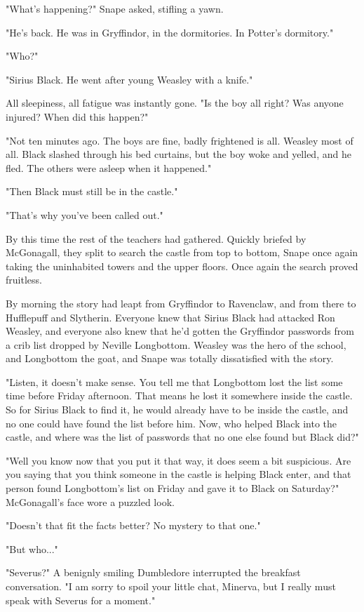 \documentclass[a4paper,11pt]{article}
\begin{document}
"What's happening?" Snape asked, stifling a yawn.

"He's back. He was in Gryffindor, in the dormitories. In Potter's dormitory."

"Who?"

"Sirius Black. He went after young Weasley with a knife."

All sleepiness, all fatigue was instantly gone. "Is the boy all right? Was anyone injured? When did this happen?"

"Not ten minutes ago. The boys are fine, badly frightened is all. Weasley most of all. Black slashed through his bed curtains, but the boy woke and yelled, and he fled. The others were asleep when it happened."

"Then Black must still be in the castle."

"That's why you've been called out."

By this time the rest of the teachers had gathered. Quickly briefed by McGonagall, they split to search the castle from top to bottom, Snape once again taking the uninhabited towers and the upper floors. Once again the search proved fruitless.

By morning the story had leapt from Gryffindor to Ravenclaw, and from there to Hufflepuff and Slytherin. Everyone knew that Sirius Black had attacked Ron Weasley, and everyone also knew that he'd gotten the Gryffindor passwords from a crib list dropped by Neville Longbottom. Weasley was the hero of the school, and Longbottom the goat, and Snape was totally dissatisfied with the story.

"Listen, it doesn't make sense. You tell me that Longbottom lost the list some time before Friday afternoon. That means he lost it somewhere inside the castle. So for Sirius Black to find it, he would already have to be inside the castle, and no one could have found the list before him. Now, who helped Black into the castle, and where was the list of passwords that no one else found but Black did?"

"Well you know now that you put it that way, it does seem a bit suspicious. Are you saying that you think someone in the castle is helping Black enter, and that person found Longbottom's list on Friday and gave it to Black on Saturday?" McGonagall's face wore a puzzled look.

"Doesn't that fit the facts better? No mystery to that one."

"But who..."

"Severus?" A benignly smiling Dumbledore interrupted the breakfast conversation. "I am sorry to spoil your little chat, Minerva, but I really must speak with Severus for a moment."
\end{document}

